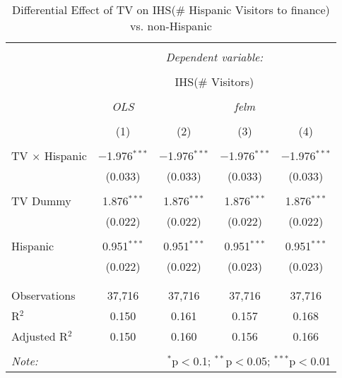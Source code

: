 
\begin{table}[!htbp] \centering 
  \caption{Differential Effect of TV on IHS(\# Hispanic Visitors to finance) vs. non-Hispanic} 
  \label{} 
\begin{tabular}{@{\extracolsep{-2pt}}lcccc} 
\\[-1.8ex]\hline 
\hline \\[-1.8ex] 
 & \multicolumn{4}{c}{\textit{Dependent variable:}} \\ 
\cline{2-5} 
\\[-1.8ex] & \multicolumn{4}{c}{IHS(\# Visitors)} \\ 
\\[-1.8ex] & \textit{OLS} & \multicolumn{3}{c}{\textit{felm}} \\ 
\\[-1.8ex] & (1) & (2) & (3) & (4)\\ 
\hline \\[-1.8ex] 
 TV $\times$ Hispanic & $-$1.976$^{***}$ & $-$1.976$^{***}$ & $-$1.976$^{***}$ & $-$1.976$^{***}$ \\ 
  & (0.033) & (0.033) & (0.033) & (0.033) \\ 
  & & & & \\ 
 TV Dummy & 1.876$^{***}$ & 1.876$^{***}$ & 1.876$^{***}$ & 1.876$^{***}$ \\ 
  & (0.022) & (0.022) & (0.022) & (0.022) \\ 
  & & & & \\ 
 Hispanic & 0.951$^{***}$ & 0.951$^{***}$ & 0.951$^{***}$ & 0.951$^{***}$ \\ 
  & (0.022) & (0.022) & (0.023) & (0.023) \\ 
  & & & & \\ 
\hline \\[-1.8ex] 
Observations & 37,716 & 37,716 & 37,716 & 37,716 \\ 
R$^{2}$ & 0.150 & 0.161 & 0.157 & 0.168 \\ 
Adjusted R$^{2}$ & 0.150 & 0.160 & 0.156 & 0.166 \\ 
\hline 
\hline \\[-1.8ex] 
\textit{Note:}  & \multicolumn{4}{r}{$^{*}$p$<$0.1; $^{**}$p$<$0.05; $^{***}$p$<$0.01} \\ 
\end{tabular} 
\end{table} 
